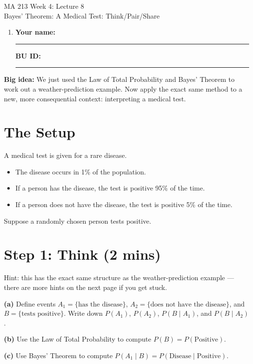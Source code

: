 \documentclass{article}
\newcommand{\coursenumber}{MA 213}
\newcommand{\weekplaceholder}{4}
\newcommand{\lectureplaceholder}{8}
\newcommand{\lecturetitle}{Bayes' Theorem: A Medical Test: Think/Pair/Share}
\newcommand{\nameblank}{\rule{1.75in}{0.4pt}}
\newcommand{\idblank}{\rule{1.55in}{0.4pt}}
\begin{document}
\begin{center}
  {\LARGE \coursenumber{} Week \weekplaceholder{}: Lecture \lectureplaceholder{}}\\
  {\large \lecturetitle{}}
\end{center}

\begin{enumerate}[label=\arabic*.,leftmargin=*,itemsep=.7em]
  \item \textbf{Your name:} \nameblank \hfill \textbf{BU ID:} \idblank
\end{enumerate}

\textbf{Big idea:} We just used the Law of Total Probability and Bayes' Theorem to work out a weather-prediction example. Now apply the exact same method to a new, more consequential context: interpreting a medical test.

\section*{The Setup}

A medical test is given for a rare disease.
\begin{itemize}
  \item The disease occurs in 1\% of the population.
  \item If a person has the disease, the test is positive 95\% of the time.
  \item If a person does not have the disease, the test is positive 5\% of the time.
\end{itemize}
Suppose a randomly chosen person tests positive.

\section*{Step 1: Think (2 mins)}
Hint: this has the exact same structure as the weather-prediction example --- there are more hints on the next page if you get stuck.

\textbf{(a)} Define events $A_1 = \{\text{has the disease}\}$, $A_2 = \{\text{does not have the disease}\}$, and $B = \{\text{tests positive}\}$. Write down $P(A_1)$, $P(A_2)$, $P(B \mid A_1)$, and $P(B \mid A_2)$.
\vspace{0.6in}

\textbf{(b)} Use the Law of Total Probability to compute $P(B) = P(\text{Positive})$.
\vspace{0.6in}

\textbf{(c)} Use Bayes' Theorem to compute $P(A_1 \mid B) = P(\text{Disease} \mid \text{Positive})$.
\vspace{0.6in}
\end{document}
